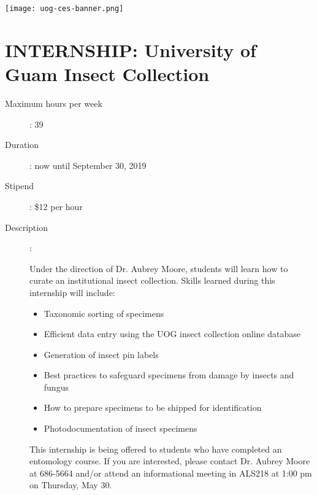 \documentclass[]{scrartcl}
\begin{document}
	
\centering	
\texttt{[image: uog-ces-banner.png]}

\section*{INTERNSHIP: University of Guam Insect Collection}

\begin{description}
	\item[Maximum hours per week]: 39
	\item[Duration]: now until September 30, 2019
	\item[Stipend]: \$12 per hour
	\item[Description]: 

Under the direction of Dr. Aubrey Moore, students will learn how to curate an institutional insect collection. Skills learned during this internship will include:
\begin{itemize}
	\item Taxonomic sorting of specimens
	\item Efficient data entry using the UOG insect collection online database
	\item Generation of insect pin labels
	\item Best practices to safeguard specimens from damage by insects and fungus
	\item How to prepare specimens to be shipped for identification
	\item Photodocumentation of insect specimens
\end{itemize}

This internship is being offered to students who have completed an entomology course. If you are interested, please contact Dr. Aubrey Moore at 686-5664 and/or attend an informational meeting in ALS218 at 1:00 pm on Thursday, May 30.
\end{description}
\end{document}
